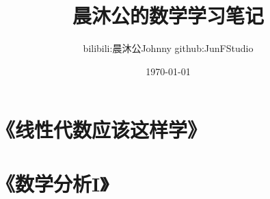 \documentclass{plainbook}
\title{晨沐公的数学学习笔记}
\author{bilibili:晨沐公Johnny \quad github:JunFStudio}
\date{\today}
\begin{document}
\frontmatter



\maketitle\pagebreak

% 





% 

% 

\tableofcontents

\mainmatter

\part{《线性代数应该这样学》}





\setcounter{chapter}{0}
\part{《数学分析I》}






% 

% 

% 

% 

% 

% 

% 

\end{document}
